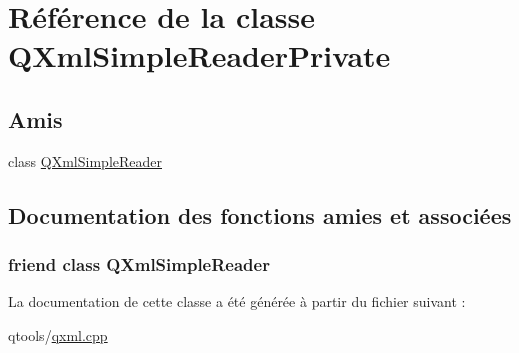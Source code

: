 \hypertarget{class_q_xml_simple_reader_private}{}\section{Référence de la classe Q\+Xml\+Simple\+Reader\+Private}
\label{class_q_xml_simple_reader_private}
\subsection*{Amis}
\begin{DoxyCompactItemize}
\item 
class \hyperlink{class_q_xml_simple_reader_private_aba6d8e1fe7917a5056b07bf8d4b4e53c}{Q\+Xml\+Simple\+Reader}
\end{DoxyCompactItemize}


\subsection{Documentation des fonctions amies et associées}
\hypertarget{class_q_xml_simple_reader_private_aba6d8e1fe7917a5056b07bf8d4b4e53c}{}
\subsubsection[{Q\+Xml\+Simple\+Reader}]{\setlength{\rightskip}{0pt plus 5cm}friend class {\bf Q\+Xml\+Simple\+Reader}\hspace{0.3cm}{\ttfamily [friend]}}\label{class_q_xml_simple_reader_private_aba6d8e1fe7917a5056b07bf8d4b4e53c}


La documentation de cette classe a été générée à partir du fichier suivant \+:\begin{DoxyCompactItemize}
\item 
qtools/\hyperlink{qxml_8cpp}{qxml.\+cpp}\end{DoxyCompactItemize}
